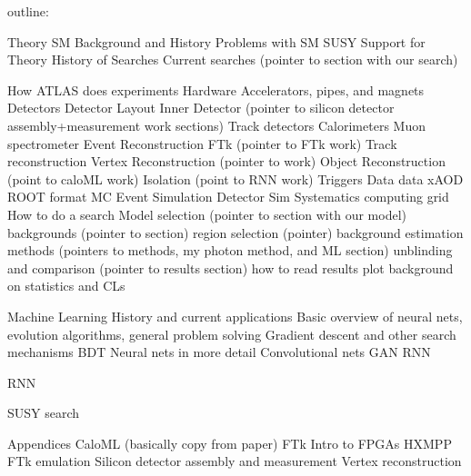 outline:

Theory
    SM
        Background and History
        Problems with SM
    SUSY
        Support for Theory
        History of Searches
        Current searches (pointer to section with our search)

How ATLAS does experiments
    Hardware
        Accelerators, pipes, and magnets
        Detectors
        Detector Layout
        Inner Detector (pointer to silicon detector assembly+measurement work sections)
        Track detectors
        Calorimeters
        Muon spectrometer
    Event Reconstruction
        FTk (pointer to FTk work)
        Track reconstruction
        Vertex Reconstruction (pointer to work)
        Object Reconstruction (point to caloML work)
        Isolation (point to RNN work)
        Triggers
    Data
        data
            xAOD
            ROOT format
        MC
            Event Simulation
            Detector Sim
            Systematics
        computing grid
    How to do a search
        Model selection (pointer to section with our model)
        backgrounds (pointer to section)
        region selection (pointer)
        background estimation methods (pointers to methods, my photon method, and ML section)
        unblinding and comparison (pointer to results section)
        how to read results plot
            background on statistics and CLs

Machine Learning
    History and current applications
    Basic overview of neural nets, evolution algorithms, general problem solving
        Gradient descent and other search mechanisms
    BDT
    Neural nets in more detail
    Convolutional nets
    GAN
    RNN

RNN

SUSY search

Appendices
    CaloML (basically copy from paper)
    FTk
        Intro to FPGAs
        HXMPP
        FTk emulation
    Silicon detector assembly and measurement
    Vertex reconstruction